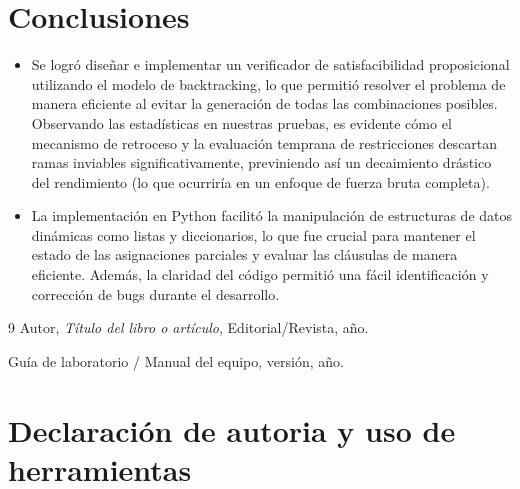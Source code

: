 \documentclass[12pt,a4paper]{article}
\begin{document}
\section{Conclusiones}
\begin{itemize}
  \item Se logró diseñar e implementar un verificador de satisfacibilidad proposicional utilizando el modelo de backtracking, lo que permitió resolver el problema de manera eficiente al evitar la generación de todas las combinaciones posibles. Observando las estadísticas en nuestras pruebas, es evidente cómo el mecanismo de retroceso y la evaluación temprana de restricciones descartan ramas inviables significativamente, previniendo así un decaimiento drástico del rendimiento (lo que ocurriría en un enfoque de fuerza bruta completa).
  \item La implementación en Python facilitó la manipulación de estructuras de datos dinámicas como listas y diccionarios, lo que fue crucial para mantener el estado de las asignaciones parciales y evaluar las cláusulas de manera eficiente. Además, la claridad del código permitió una fácil identificación y corrección de bugs durante el desarrollo. 
\end{itemize}


\begin{thebibliography}{9}
Autor, \textit{Título del libro o artículo}, Editorial/Revista, año.

Guía de laboratorio / Manual del equipo, versión, año.
\end{thebibliography}

\section{Declaración de autoria y uso de herramientas}
\end{document}
